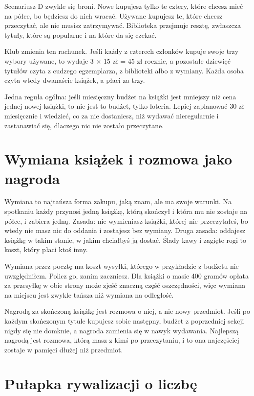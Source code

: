 Scenariusz D zwykle się broni. Nowe kupujesz tylko te cztery, które chcesz mieć na półce, bo będziesz do nich wracać. Używane kupujesz te, które chcesz przeczytać, ale nie musisz zatrzymywać. Biblioteka przejmuje resztę, zwłaszcza tytuły, które są popularne i na które da się czekać.

Klub zmienia ten rachunek. Jeśli każdy z czterech członków kupuje swoje trzy wybory używane, to wydaje 3 $\times$ 15 zł = 45 zł rocznie, a pozostałe dziewięć tytułów czyta z cudzego egzemplarza, z biblioteki albo z wymiany. Każda osoba czyta wtedy dwanaście książek, a płaci za trzy.

Jedna reguła ogólna: jeśli miesięczny budżet na książki jest mniejszy niż cena jednej nowej książki, to nie jest to budżet, tylko loteria. Lepiej zaplanować 30 zł miesięcznie i wiedzieć, co za nie dostaniesz, niż wydawać nieregularnie i zastanawiać się, dlaczego nic nie zostało przeczytane.

\section{Wymiana książek i rozmowa jako nagroda}

Wymiana to najtańsza forma zakupu, jaką znam, ale ma swoje warunki. Na spotkaniu każdy przynosi jedną książkę, którą skończył i która mu nie zostaje na półce, i zabiera jedną. Zasada: nie wymieniasz książki, której nie przeczytałeś, bo wtedy nie masz nic do oddania i zostajesz bez wymiany. Druga zasada: oddajesz książkę w takim stanie, w jakim chciałbyś ją dostać. Ślady kawy i zagięte rogi to koszt, który płaci ktoś inny.

Wymiana przez pocztę ma koszt wysyłki, którego w przykładzie z budżetu nie uwzględniłem. Policz go, zanim zaczniesz. Dla książki o masie 400 gramów opłata za przesyłkę w obie strony może zjeść znaczną część oszczędności, więc wymiana na miejscu jest zwykle tańsza niż wymiana na odległość.

Nagrodą za skończoną książkę jest rozmowa o niej, a nie nowy przedmiot. Jeśli po każdym skończonym tytule kupujesz sobie następny, budżet z poprzedniej sekcji nigdy się nie domknie, a nagroda zamienia się w nawyk wydawania. Najlepszą nagrodą jest rozmowa, którą masz z kimś po przeczytaniu, i to ona najczęściej zostaje w pamięci dłużej niż przedmiot.

\section{Pułapka rywalizacji o liczbę}


